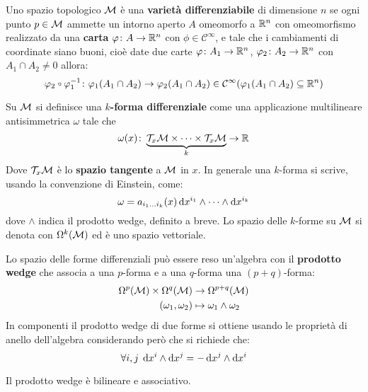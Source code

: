 \begin{definition}
  Uno spazio topologico $ \mathcal{M} $ è una \textbf{varietà differenziabile}
  di dimensione $ n $ se ogni punto $ p \in \mathcal{M} $ ammette un intorno aperto $ A $ omeomorfo a $ \mathbb{R}^{n} $
  con omeomorfismo realizzato da una \textbf{carta}
  $ \varphi \colon A \to \mathbb{R}^{n} $ con $ \phi \in \mathcal{C}^\infty $, e tale che i cambiamenti di coordinate siano buoni, cioè
  date due carte $ \varphi \colon A_1 \to \mathbb{R}^{n} $, $ \varphi_2 \colon A_2 \to \mathbb{R}^{n} $ con $ A_1 \cap A_2 \not = 0 $ allora:
  \[
    \phi_2 \circ \phi_1^{-1} \colon \phi_1(A_1 \cap A_2) \to \phi_2(A_1 \cap A_2) \in \mathcal{C}^\infty(\phi_1(A_1 \cap A_2) \subseteq \RN{n})
  \]
\end{definition}
\begin{definition}
  Su $ \mathcal{M} $ si definisce una \textbf{$ k $-forma differenziale} come
  una applicazione multilineare antisimmetrica $ \omega $ tale che
  \[
    \omega(x) \colon \underbrace{\mathcal{T}_x\mathcal{M} \times \dots \times \mathcal{T}_x\mathcal{M}}_{k} \to \mathbb{R}^{}
  \]
  Dove $ \mathcal{T}_x\mathcal{M} $ è lo \textbf{spazio tangente} a $ \mathcal{M} $ in $ x $.
  In generale una $ k $-forma si scrive, usando la convenzione di Einstein, come:
  \[
    \omega = a_{i_1\dots i_k}(x) \operatorname{d}\!{x}^{i_1} \wedge \dots \wedge \operatorname{d}\!{x}^{i_k}
  \]
  dove $ \wedge $ indica il prodotto wedge, definito a breve. Lo spazio delle
  $ k $-forme su $ \mathcal{M} $ si denota con $ \Omega^k(\mathcal{M}) $ ed è uno spazio vettoriale.
\end{definition}
\begin{definition}
  Lo spazio delle forme differenziali può essere reso un'algebra con il \textbf{prodotto wedge}
  che associa a una $ p $-forma e a una $ q $-forma una $ (p+q) $-forma:
  \begin{align*}
    \Omega^p(\mathcal{M}) \times \Omega^q(\mathcal{M}) & \to \Omega^{p+q}(\mathcal{M}) \\
    (\omega_1, \omega_2) & \mapsto \omega_1 \wedge \omega_2
  \end{align*}
  In componenti il prodotto wedge di due forme si ottiene usando le proprietà di anello dell'algebra
  considerando però che si richiede che:
  \[
    \forall i,j \; \operatorname{d}\!{x}^i \wedge \operatorname{d}\!{x}^j = - \operatorname{d}\!{x}^j \wedge \operatorname{d}\!{x}^i
  \]
\end{definition}
Il prodotto wedge è bilineare e associativo.

